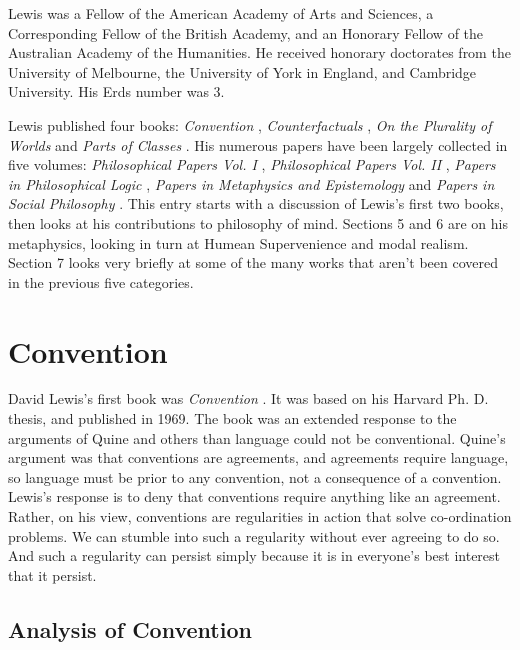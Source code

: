 Lewis was a Fellow of the American Academy of Arts and Sciences, a Corresponding Fellow of the British Academy, and an Honorary Fellow of the Australian Academy of the Humanities. He received honorary doctorates from the University of Melbourne, the University of York in England, and Cambridge University. His Erds number was 3.

Lewis published four books: \textit{Convention} \citeyearpar{Lewis1969a}, \textit{Counterfactuals} \citeyearpar{Lewis1973a}, \textit{On the Plurality of Worlds} \citeyearpar{Lewis1986a} and \textit{Parts of Classes} \citeyearpar{Lewis1991a}. His numerous papers have been largely collected in five volumes: \textit{Philosophical Papers Vol. I} \citeyearpar{Lewis1983a}, \textit{Philosophical Papers Vol. II} \citeyearpar{Lewis1986b}, \textit{Papers in Philosophical Logic} \citeyearpar{Lewis1998a}, \textit{Papers in Metaphysics and Epistemology} \citeyearpar{Lewis1999a} and \textit{Papers in Social Philosophy} \citeyearpar{Lewis2000a}. This entry starts with a discussion of Lewis's first two books, then looks at his contributions to philosophy of mind. Sections 5 and 6 are on his metaphysics, looking in turn at Humean Supervenience and modal realism. Section 7 looks very briefly at some of the many works that aren't been covered in the previous five categories.

\section{Convention} David Lewis's first book was \textit{Convention} \citeyearpar[note that all citations are to works by David Lewis, unless explicitly stated otherwise]{Lewis1969a}. It was based on his Harvard Ph. D. thesis, and published in 1969. The book was an extended response to the arguments of Quine and others than language could not be conventional. Quine's argument was that conventions are agreements, and agreements require language, so language must be prior to any convention, not a consequence of a convention. Lewis's response is to deny that conventions require anything like an agreement. Rather, on his view, conventions are regularities in action that solve co-ordination problems. We can stumble into such a regularity without ever agreeing to do so. And such a regularity can persist simply because it is in everyone's best interest that it persist.

\subsection{Analysis of Convention}

